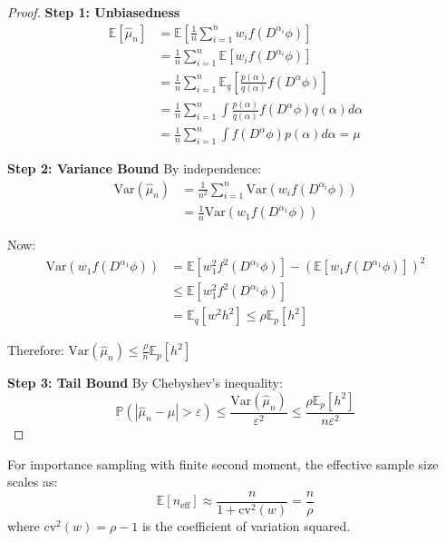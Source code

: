 \begin{proof}
\textbf{Step 1: Unbiasedness}
\begin{align}
\mathbb{E}[\hat{\mu}_n] &= \mathbb{E}\left[\frac{1}{n} \sum_{i=1}^n w_i f(D^{\alpha_i} \phi)\right] \\
&= \frac{1}{n} \sum_{i=1}^n \mathbb{E}[w_i f(D^{\alpha_i} \phi)] \\
&= \frac{1}{n} \sum_{i=1}^n \mathbb{E}_q\left[\frac{p(\alpha)}{q(\alpha)} f(D^{\alpha} \phi)\right] \\
&= \frac{1}{n} \sum_{i=1}^n \int \frac{p(\alpha)}{q(\alpha)} f(D^{\alpha} \phi) q(\alpha) d\alpha \\
&= \frac{1}{n} \sum_{i=1}^n \int f(D^{\alpha} \phi) p(\alpha) d\alpha = \mu
\end{align}

\textbf{Step 2: Variance Bound}
By independence:
\begin{align}
\text{Var}(\hat{\mu}_n) &= \frac{1}{n^2} \sum_{i=1}^n \text{Var}(w_i f(D^{\alpha_i} \phi)) \\
&= \frac{1}{n} \text{Var}(w_1 f(D^{\alpha_1} \phi))
\end{align}

Now:
\begin{align}
\text{Var}(w_1 f(D^{\alpha_1} \phi)) &= \mathbb{E}[w_1^2 f^2(D^{\alpha_1} \phi)] - (\mathbb{E}[w_1 f(D^{\alpha_1} \phi)])^2 \\
&\leq \mathbb{E}[w_1^2 f^2(D^{\alpha_1} \phi)] \\
&= \mathbb{E}_q[w^2 h^2] \leq \rho \mathbb{E}_p[h^2]
\end{align}

Therefore: $\text{Var}(\hat{\mu}_n) \leq \frac{\rho}{n} \mathbb{E}_p[h^2]$

\textbf{Step 3: Tail Bound}
By Chebyshev's inequality:
\begin{equation}
\mathbb{P}(|\hat{\mu}_n - \mu| > \varepsilon) \leq \frac{\text{Var}(\hat{\mu}_n)}{\varepsilon^2} \leq \frac{\rho \mathbb{E}_p[h^2]}{n \varepsilon^2}
\end{equation}
\end{proof}

\begin{corollary}
For importance sampling with finite second moment, the effective sample size scales as:
\begin{equation}
\mathbb{E}[n_{\text{eff}}] \approx \frac{n}{1 + \text{cv}^2(w)} = \frac{n}{\rho}
\end{equation}
where $\text{cv}^2(w) = \rho - 1$ is the coefficient of variation squared.
\end{corollary}


